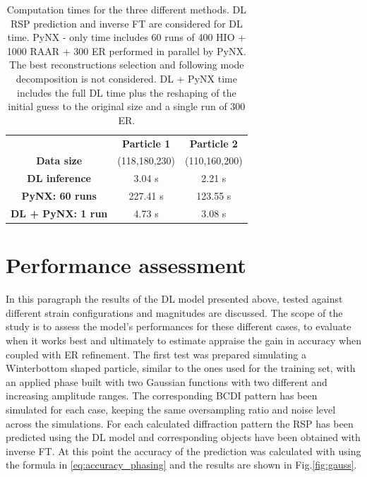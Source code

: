 \begin{table}[h]
    \centering
    \begin{tabular}{ccc}
         & \textbf{Particle 1} & \textbf{Particle 2} \\
        \textbf{Data size} & (118,180,230) & (110,160,200) \\
        \textbf{DL inference} & 3.04 s & 2.21 s \\
        \textbf{PyNX: 60 runs} & 227.41 s & 123.55 s \\
        \textbf{DL + PyNX: 1 run} &  4.73 s & 3.08 s \\
    \end{tabular}
    \caption{Computation times for the three different methods. DL RSP prediction and inverse FT are considered for 
    DL time. PyNX - only time includes 60 runs of 400 HIO + 1000 RAAR + 300 ER performed in parallel by PyNX. The best 
    reconstructions selection and following mode decomposition is not considered. DL + PyNX time includes 
    the full DL time plus the reshaping of the initial guess to the original size and a single run of 300 ER. }
    \label{tab:times}
\end{table}


\section{Performance assessment}\label{chp:performance}
In this paragraph the results of the DL model presented above, tested against different strain configurations and magnitudes are discussed. 
The scope of the study is to assess the model's performances for these different cases, to evaluate when it works best 
and ultimately to estimate appraise the gain in accuracy when coupled with ER refinement. 
The first test was prepared simulating a Winterbottom shaped particle, similar to the ones used for the training set,
with an applied phase built with two Gaussian functions with two different and increasing amplitude ranges. The 
corresponding BCDI pattern has been simulated for each case, keeping the same oversampling ratio and noise level across 
the simulations. For each calculated diffraction pattern the RSP has been predicted using the DL model and corresponding 
objects have been obtained with inverse FT. At this point the accuracy of the prediction was calculated with using the 
formula in \ref{eq:accuracy_phasing} and the results are shown in Fig.\ref{fig:gauss}. 

